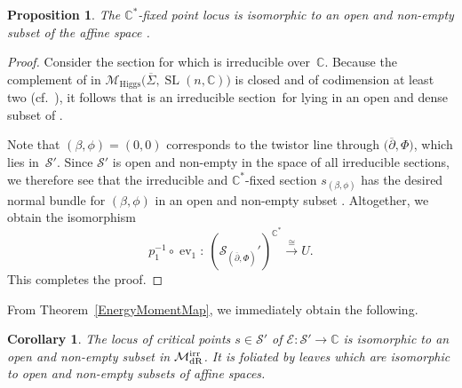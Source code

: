 \documentclass[pdftex]{sigma}
\numberwithin{equation}{section}
\newtheorem{Corollary}[Theorem]{Corollary}
\newtheorem{Proposition}[Theorem]{Proposition}
\theoremstyle{definition}
\newcommand\C{{\mathbb C}}
\begin{document}
\begin{Proposition}\label{Prop:classifying_C*-fixed_sections}
The $\C^*$-fixed point locus \smash{$(\mathcal{S}'_{({\overline{\partial}}, \Phi)})^{\C^*}$} is isomorphic to an
open and non-empty subset of the affine space .
\end{Proposition}

\begin{proof}
Consider the section \smash{$s_{(\beta, \phi)} \colon \C P^1 \longrightarrow
 \mathcal{M}_{\mathrm{DH}}$} for  which is irreducible over~$\C$.
Because the complement of \smash{$\mathcal{M}_{\mathrm{Higgs}}^{\rm irr}\big(\overline{\Sigma}, \operatorname{SL}(n,\C)\big)$} in
$\mathcal{M}_{\mathrm{Higgs}}\big(\overline{\Sigma}, \operatorname{SL}(n,\C)\big)$ is closed and of codimension at least two
(cf.\ \cite{Faltings}), it follows that  is an irreducible section~for  lying in an open and dense
subset of .

Note that $(\beta, \phi) = (0, 0)$ corresponds to the twistor line 
through $\bigl({\overline{\partial}}, \Phi\bigr)$, which lies in~$\mathcal{S}'$. Since $\mathcal{S}'$ is open and
non-empty in the space of all irreducible sections, we therefore see that the irreducible and
$\C^*$-fixed section $s_{(\beta, \phi)}$ has the desired normal bundle for $(\beta, \phi)$ in an
open and non-empty subset . Altogether, we obtain the
isomorphism
\[
p_1^{-1} \circ \operatorname{ev}_1 \colon\ (\mathcal{S}_{({\overline{\partial}}, \Phi)}')^{\C^*}
 \overset{\cong}{\longrightarrow} U.
\]
This completes the proof.
\end{proof}

From Theorem~\ref{EnergyMomentMap}, we immediately obtain the following.

\begin{Corollary}
The locus of critical points $s \in \mathcal{S}'$ of $\mathcal{E} \colon \mathcal{S}'
 \longrightarrow \C$ is isomorphic to an open and non-empty subset in $\mathcal{M}_{\mathrm{dR}}^{\rm irr}$.
It is foliated by leaves which are isomorphic to open and non-empty subsets of affine spaces.
\end{Corollary}
\end{document}
